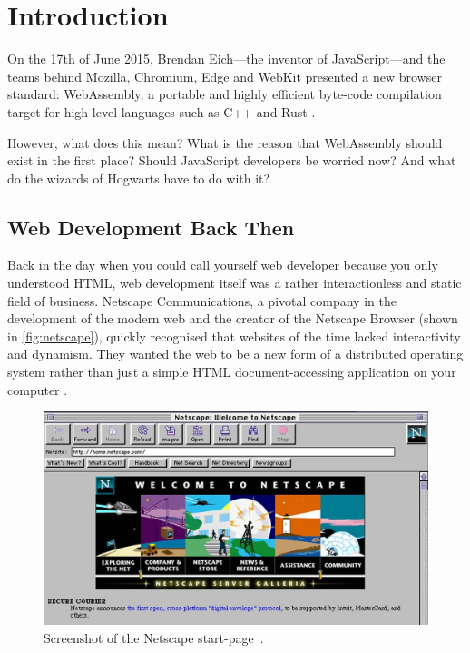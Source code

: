\documentclass[10pt]{article}  %
\newcommand{\floatcaption}[2]{\caption[#1.]{#1~#2.}}
\begin{document}
\begin{sloppypar}


  \section{Introduction}
  \label{sec:introduction}

  On the 17th of June 2015, Brendan Eich—the inventor of JavaScript—and the teams behind Mozilla, Chromium, Edge and WebKit presented a new browser standard: \mbox{WebAssembly}, a portable and highly efficient byte-code compilation target for high-level languages such as C++ and Rust \citep{eich_asmjs_2015}.

  However, what does this mean? What is the reason that WebAssembly should exist in the first place? Should JavaScript developers be worried now? And what do the wizards of Hogwarts have to do with it?

  \subsection{Web Development Back Then}
  \label{sec:back-then}

  Back in the day when you could call yourself web developer because you only understood HTML, web development itself was a rather interactionless and static field of business. Netscape Communications, a pivotal company in the development of the modern web and the creator of the Netscape Browser (shown in \autoref{fig:netscape}), quickly recognised that websites of the time lacked interactivity and dynamism. They wanted the web to be a new form of a distributed operating system rather than just a simple HTML document-accessing application on your computer \citep{cassel_brendan_2018}.

  \begin{figure}[ht]
    \centering
    \includegraphics[width=\textwidth]{figures/netscape.jpg}
    \floatcaption{Screenshot of the Netscape start-page}{\citep{npr_home_nodate}}
    \label{fig:netscape}
  \end{figure}


\end{sloppypar}
\end{document}
